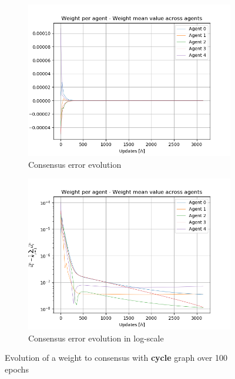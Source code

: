 \documentclass[a4paper,11pt,oneside]{book}
\begin{document}
\begin{figure}[H]
\centering
	\begin{subfigure}{0.49\textwidth}	
	\includegraphics[width=\textwidth]{cycle/weight_100}
	\caption{Consensus error evolution}
	\end{subfigure}
\hfill
	\begin{subfigure}{0.49\textwidth}	
	\includegraphics[width=\textwidth]{cycle/weight_100_log}
	\caption{Consensus error evolution in log-scale}
	\end{subfigure}
\caption{Evolution of a weight to consensus with \textbf{cycle} graph over 100 epochs}
\label{cycle_test}
\end{figure}
\end{document}
